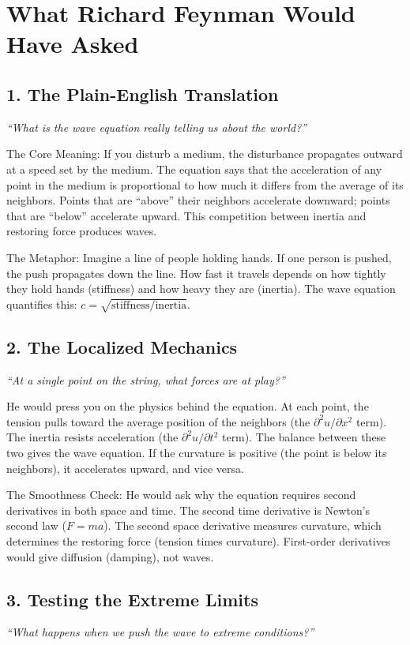 \section*{What Richard Feynman Would Have Asked}

\subsection*{1. The Plain-English Translation}
\textit{``What is the wave equation really telling us about the world?''}

The Core Meaning: If you disturb a medium, the disturbance propagates outward at a speed set by the medium. The equation says that the acceleration of any point in the medium is proportional to how much it differs from the average of its neighbors. Points that are ``above'' their neighbors accelerate downward; points that are ``below'' accelerate upward. This competition between inertia and restoring force produces waves.

The Metaphor: Imagine a line of people holding hands. If one person is pushed, the push propagates down the line. How fast it travels depends on how tightly they hold hands (stiffness) and how heavy they are (inertia). The wave equation quantifies this: $c = \sqrt{\text{stiffness}/\text{inertia}}$.

\subsection*{2. The Localized Mechanics}
\textit{``At a single point on the string, what forces are at play?''}

He would press you on the physics behind the equation. At each point, the tension pulls toward the average position of the neighbors (the $\partial^2 u/\partial x^2$ term). The inertia resists acceleration (the $\partial^2 u/\partial t^2$ term). The balance between these two gives the wave equation. If the curvature is positive (the point is below its neighbors), it accelerates upward, and vice versa.

The Smoothness Check: He would ask why the equation requires second derivatives in both space and time. The second time derivative is Newton's second law ($F = ma$). The second space derivative measures curvature, which determines the restoring force (tension times curvature). First-order derivatives would give diffusion (damping), not waves.

\subsection*{3. Testing the Extreme Limits}
\textit{``What happens when we push the wave to extreme conditions?''}

